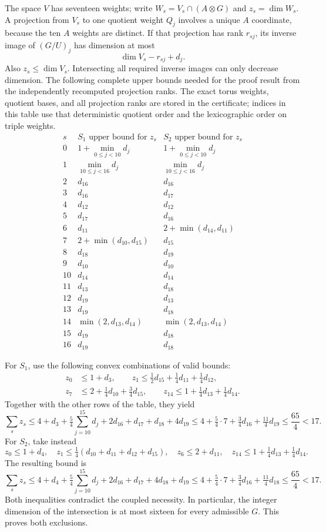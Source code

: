 The space $V$ has seventeen weights; write
$W_s=V_s\cap(A\otimes G)$ and $z_s=\dim W_s$.  A projection from
$V_s$ to one quotient weight $Q_j$ involves a unique $A$ coordinate,
because the ten $A$ weights are distinct.  If that projection has rank
$r_{sj}$, its inverse image of $(G/U)_j$ has dimension at most
\[
 \dim V_s-r_{sj}+d_j.
\]
Also $z_s\le\dim V_s$.  Intersecting all required inverse images can
only decrease dimension.  The following complete upper bounds needed
for the proof result from the independently recomputed projection ranks.
The exact torus weights, quotient bases, and all projection ranks are
stored in the certificate; indices in this table use that deterministic
quotient order and the lexicographic order on triple weights.
\[
\begin{array}{c|l|l}
s& S_1\text{ upper bound for }z_s&S_2\text{ upper bound for }z_s\\\hline
0&1+\min_{0\le j<10}d_j&1+\min_{0\le j<10}d_j\\
1&\min_{10\le j<16}d_j&\min_{10\le j<16}d_j\\
2&d_{16}&d_{16}\\
3&d_{16}&d_{17}\\
4&d_{12}&d_{12}\\
5&d_{17}&d_{16}\\
6&d_{11}&2+\min(d_{14},d_{11})\\
7&2+\min(d_{10},d_{15})&d_{15}\\
8&d_{18}&d_{19}\\
9&d_{10}&d_{10}\\
10&d_{14}&d_{14}\\
11&d_{13}&d_{18}\\
12&d_{19}&d_{13}\\
13&d_{19}&d_{18}\\
14&\min(2,d_{13},d_{14})&\min(2,d_{13},d_{14})\\
15&d_{19}&d_{18}\\
16&d_{19}&d_{18}
\end{array}
\]

For $S_1$, use the following convex combinations of valid bounds:
\[
\begin{split}
z_0&\le1+d_3,\qquad
z_1\le\tfrac12d_{15}+\tfrac14d_{11}+\tfrac14d_{12},\\
z_7&\le2+\tfrac14d_{10}+\tfrac34d_{15},\qquad
z_{14}\le1+\tfrac14d_{13}+\tfrac14d_{14}.
\end{split}
\]
Together with the other rows of the table, they yield
\[
 \sum_s z_s\le4+d_3+\tfrac54\sum_{j=10}^{15}d_j
                    +2d_{16}+d_{17}+d_{18}+4d_{19}
 \le4+\tfrac54\cdot7+\tfrac34d_{16}+\tfrac{11}{4}d_{19}
 \le\frac{65}{4}<17.
\]
For $S_2$, take instead
\[
 z_0\le1+d_4,\quad
 z_1\le\tfrac14(d_{10}+d_{11}+d_{12}+d_{15}),\quad
 z_6\le2+d_{11},\quad
 z_{14}\le1+\tfrac14d_{13}+\tfrac14d_{14}.
\]
The resulting bound is
\[
 \sum_s z_s\le4+d_4+\tfrac54\sum_{j=10}^{15}d_j
                    +2d_{16}+d_{17}+4d_{18}+d_{19}
 \le4+\tfrac54\cdot7+\tfrac34d_{16}+\tfrac{11}{4}d_{18}
 \le\frac{65}{4}<17.
\]
Both inequalities contradict the coupled necessity.  In particular,
the integer dimension of the intersection is at most sixteen for every
admissible $G$.  This proves both exclusions.

